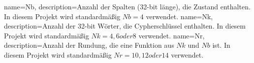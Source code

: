 
{
    name=Nb,
    description={Anzahl der Spalten (32-bit länge), die Zustand enthalten. In diesem Projekt wird standardmäßig $Nb = 4$ verwendet.}
}
{
    name=Nk,
    description={Anzahl der 32-bit Wörter, die Cypherschlüssel enthalten. In diesem Projekt wird standardmäßig $Nk = 4, 6 oder 8$ verwendet.}
}
{
    name=Nr,
    description={Anzahl der Rundung, die eine Funktion aus $Nk$ und $Nb$ ist. In diesem Projekt wird standardmäßig $Nr = 10, 12 oder 14$ verwendet.}
}